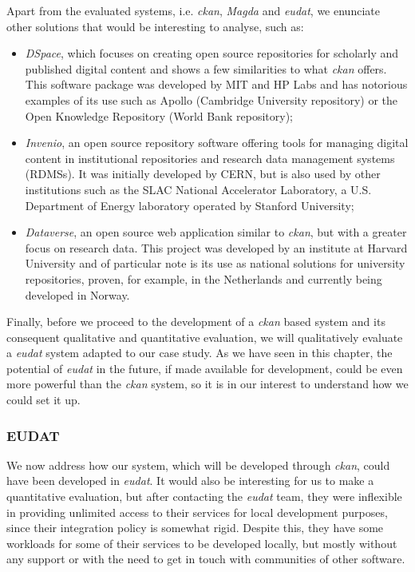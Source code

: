 Apart from the evaluated systems, i.e. \textit{\gls{ckan}}, \textit{Magda} and \textit{\gls{eudat}}, we enunciate other solutions that would be interesting to analyse, such as:
  
\begin{itemize}
    \item \textit{DSpace}, which focuses on creating open source repositories for scholarly and published digital content and shows a few similarities to what \textit{\gls{ckan}} offers. This software package was developed by MIT and HP Labs and has notorious examples of its use such as Apollo (Cambridge University repository) or the Open Knowledge Repository (World Bank repository);
    \item \textit{Invenio}, an open source repository software offering tools for managing digital content in institutional repositories and research data management systems (RDMSs). It was initially developed by CERN, but is also used by other institutions such as the SLAC National Accelerator Laboratory, a U.S. Department of Energy laboratory operated by Stanford University;
    \item \textit{Dataverse}, an open source web application similar to \textit{\gls{ckan}}, but with a greater focus on research data. This project was developed by an institute at Harvard University and of particular note is its use as national solutions for university repositories, proven, for example, in the Netherlands and currently being developed in Norway.
\end{itemize}

Finally, before we proceed to the development of a \textit{\gls{ckan}} based system and its consequent qualitative and quantitative evaluation, we will qualitatively evaluate a \textit{\gls{eudat}} system adapted to our case study. As we have seen in this chapter, the potential of \textit{\gls{eudat}} in the future, if made available for development, could be even more powerful than the \textit{\gls{ckan}} system, so it is in our interest to understand how we could set it up.

\subsubsection{EUDAT}

We now address how our system, which will be developed through \textit{\gls{ckan}}, could have been developed in \textit{\gls{eudat}}. It would also be interesting for us to make a quantitative evaluation, but after contacting the \textit{\gls{eudat}} team, they were inflexible in providing unlimited access to their services for local development purposes, since their integration policy is somewhat rigid. Despite this, they have some workloads for some of their services to be developed locally, but mostly without any support or with the need to get in touch with communities of other software.

